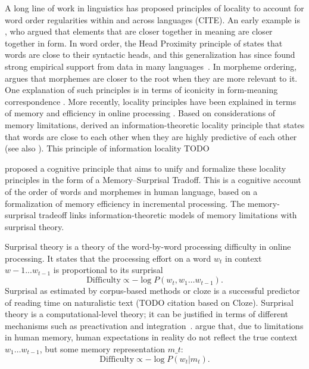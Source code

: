 \documentclass[11pt,letterpaper]{article}
\begin{document}
A long line of work in linguistics has proposed principles of locality to account for word order regularities within and across languages (CITE).
An early example is \citep{behaghel1932deutsche}, who argued that elements that are closer together in meaning are closer together in form.
In word order, the Head Proximity principle of \citep{rijkhoff-word-1986} states that words are close to their syntactic heads, and this generalization has since found strong empirical support from data in many languages~\cite[e.g.][]{liu2008dependency, futrell-large-scale-2015-1, liu-dependency-2017}.
In morpheme ordering, \citep{bybee-morphology-1985} argues that morphemes are closer to the root when they are more relevant to it.
One explanation of such principles is in terms of iconicity in form-meaning correspondence \citep{givon1985iconicity}.
More recently, locality principles have been explained in terms of memory and efficiency in online processing \citep{hawkins-efficiency-2003}.
Based on considerations of memory limitations, \citet{futrell2020lossy} derived an information-theoretic locality principle that states that words are close to each other when they are highly predictive of each other (see also \citet{culbertson2020from}).
This principle of information locality TODO


\citet{Hahn2020modeling} proposed a cognitive principle that aims to unify and formalize these locality principles in the form of a Memory--Surprisal Tradoff.
This is a cognitive account of the order of words and morphemes in human language, based on a formalization of memory efficiency in incremental processing.
The memory-surprisal tradeoff links information-theoretic models of memory limitations with surprisal theory.

Surprisal theory \citep{hale2001probabilistic, levy2008expectation} is a theory of the word-by-word processing difficulty in online processing.
It states that the processing effort on a word $w_t$ in context $w-1 ... w_{t-1}$ is proportional to its surprisal
     \begin{equation}   \label{eq:true-surp}
    \text{Difficulty} \propto -\log P(w_t , w_1\dots w_{t-1}).
\end{equation}
Surprisal as estimated by corpus-based methods or cloze is a successful predictor of reading time on naturalistic text \citep{smith2013effect,goodkind-predictive-2018,frank2019interaction,aurnhammer2019evaluating,wilcox2020predictive} (TODO citation based on Cloze).
Surprisal theory is a computational-level theory; it can be justified in terms of different mechanisms such as preactivation and integration~\citep{kuperberg2016we}.
\citet{Hahn2020modeling} argue that, due to limitations in human memory, human expectations in reality do not reflect the true context $w_1\dots w_{t-1}$, but some memory representation $m\_t$:
\begin{equation}   \label{eq:lossy-surp}
    \text{Difficulty} \propto -\log P(w_t | m_t).
\end{equation}
\end{document}

